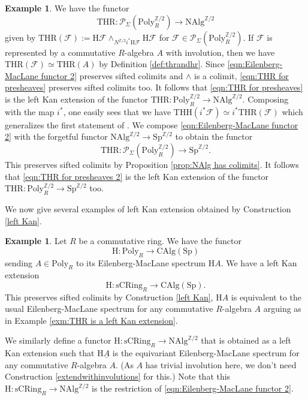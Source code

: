 \documentclass[10pt]{amsart}
\theoremstyle{definition}
\newtheorem{exm}[thm]{Example}
\numberwithin{equation}{section}
\newcommand{\Z}{\mathbb{Z}}
\newcommand{\cF}{\mathcal{F}}
\newcommand{\cP}{\mathcal{P}}
\newcommand{\rH}{\mathrm{H}}
\newcommand{\ul}{\underline}
\newcommand{\CAlg}{\mathrm{CAlg}}
\newcommand{\sCRing}{\mathrm{sCRing}}
\newcommand{\NAlg}{\mathrm{NAlg}}
\newcommand{\Sp}{\mathrm{Sp}}
\newcommand{\Poly}{\mathrm{Poly}}
\newcommand{\THH}{\mathrm{THH}}
\newcommand{\THR}{\mathrm{THR}}
\begin{document}
\begin{exm}
We have the functor
\begin{equation}
\label{eqn:THR for presheaves}
\THR
\colon
\cP_\Sigma(\Poly_R^{\Z/2})
\to
\NAlg^{\Z/2}
\end{equation}
given by $\THR(\cF):=\rH \cF\wedge_{N^{\Z/2}i^*\rH \cF}\rH \cF$ for $\cF\in 
\cP_\Sigma(\Poly_R^{\Z/2})$.
If $\cF$ is represented by a commutative $R$-algebra $A$ with involution,
then we have $\THR(\cF)\simeq \THR(A)$
by Definition \ref{def:thrandhr}.
Since \eqref{eqn:Eilenberg-MacLane functor 2} preserves sifted colimits and $\wedge$ is a colimit,
\eqref{eqn:THR for presheaves} preserves sifted colimits too.
It follows that \eqref{eqn:THR for presheaves} is the left Kan extension of the functor $\THR\colon \Poly_R^{\Z/2}\to \NAlg^{\Z/2}$.
Composing with the map $i^*$, one easily sees that we have $\THH(i^* \cF) \simeq i^*\THR(\cF)$ which generalizes the first statement of \cite[Proposition 2.1.3]{HP23}.
We compose \eqref{eqn:Eilenberg-MacLane functor 2} with the forgetful functor $\NAlg^{\Z/2}\to \Sp^{\Z/2}$ to obtain the functor
\begin{equation}
\label{eqn:THR for presheaves 2}
\THR\colon \cP_\Sigma(\Poly_R^{\Z/2})
\to
\Sp^{\Z/2}.
\end{equation}
This preserves sifted colimits by Proposition \ref{prop:NAlg has colimits}.
It follows that 
\eqref{eqn:THR for presheaves 2} is the left Kan extension of the functor $\THR\colon \Poly_R^{\Z/2}\to \Sp^{\Z/2}$ too.
\end{exm}


We now give several examples of left Kan extension obtained by Construction \ref{left Kan}.

\begin{exm}
\label{left Kan H}
Let $R$ be a commutative ring.
We have the functor
\[
\rH
\colon
\Poly_R
\to
\CAlg(\Sp)
\]
sending $A\in \Poly_R$ to its Eilenberg-MacLane spectrum $\rH A$. 
We have a
left Kan extension
\[
\rH
\colon
\sCRing_R
\to
\CAlg(\Sp).
\]
This preserves sifted colimits by Construction \ref{left Kan},
$\rH A$ is equivalent to the usual Eilenberg-MacLane spectrum for any commutative $R$-algebra $A$ arguing
as in Example \ref{exm:THR is a left Kan extension}.


We similarly
define a functor $\rH \colon \sCRing_R\to \NAlg^{\Z/2}$ that
is obtained as a left Kan extension such that
$\rH \ul{A}$ is the equivariant Eilenberg-MacLane spectrum for any commutative $R$-algebra $A$.
(As $A$ has trivial involution here, we don't need Construction \ref{extendwithinvolutions} for this.)
Note that this $\rH \colon \sCRing_R\to \NAlg^{\Z/2}$ is the restriction of \eqref{eqn:Eilenberg-MacLane functor 2}.
\end{exm}
\end{document}
